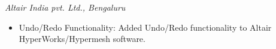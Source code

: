 \documentclass[
	a4paper,
]{fortysecondscv}
\begin{document}
\vspace{-14.5pt}






\begin{cvtable}[0.5]
	{\hspace{-72} \emph{Altair India pvt. Ltd., Bengaluru}
	\vspace{-5pt}
	\begin{itemize}[leftmargin=-2cm]
	\item Undo/Redo Functionality: Added Undo/Redo functionality to Altair HyperWorks/Hypermesh software.

	\end{itemize}
	}

\end{cvtable}
\vspace{-15pt}
















\iffalse
\cvsignature
\fi
\end{document}
